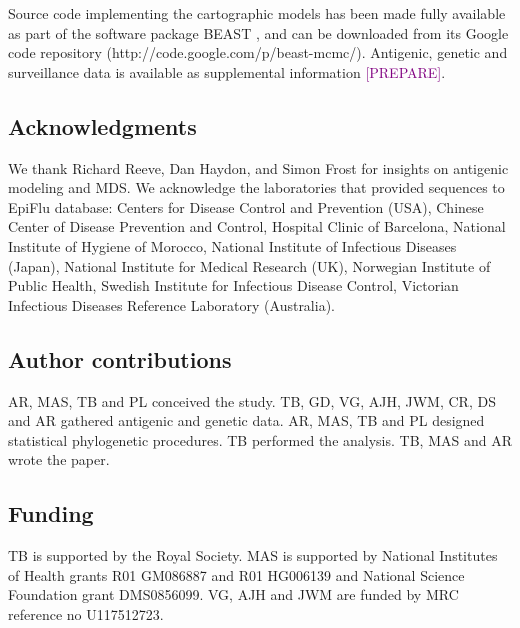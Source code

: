 \documentclass[11pt,oneside,letterpaper]{article}
\def\tbc#1{\textcolor{purple}{[#1]}}
\begin{document}
Source code implementing the cartographic models has been made fully available as part of the software package BEAST \cite{BEAST17}, and can be downloaded from its Google code repository (http://code.google.com/p/beast-mcmc/).
Antigenic, genetic and surveillance data is available as supplemental information \tbc{PREPARE}.

\subsection*{Acknowledgments} 

We thank Richard Reeve, Dan Haydon, and Simon Frost for insights on antigenic modeling and MDS.
We acknowledge the laboratories that provided sequences to EpiFlu database: Centers for Disease Control and Prevention (USA), Chinese Center of Disease Prevention and Control, Hospital Clinic of Barcelona, National Institute of Hygiene of Morocco, National Institute of Infectious Diseases (Japan), National Institute for Medical Research (UK), Norwegian Institute of Public Health, Swedish Institute for Infectious Disease Control, Victorian Infectious Diseases Reference Laboratory (Australia).

\subsection*{Author contributions} 

AR, MAS, TB and PL conceived the study.
TB, GD, VG, AJH, JWM, CR, DS and AR gathered antigenic and genetic data.
AR, MAS, TB and PL designed statistical phylogenetic procedures.
TB performed the analysis.
TB, MAS and AR wrote the paper.

\subsection*{Funding} 

TB is supported by the Royal Society. 
MAS is supported by National Institutes of Health grants R01 GM086887 and R01 HG006139 and National Science Foundation grant DMS0856099.
VG, AJH and JWM are funded by MRC reference no U117512723.




\pagebreak

\setcounter{figure}{0}
\setcounter{table}{0}
\renewcommand{\thefigure}{S\arabic{figure}}
\renewcommand{\thetable}{S\arabic{table}}
\end{document}
